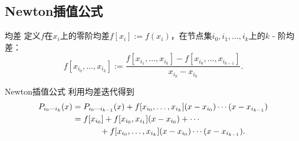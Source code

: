 \subsection{Newton插值公式}

\begin{definition}
    {均差}{}
    定义$f$在$x_i$上的零阶均差$f[x_i]:=f(x_i)$，在节点集$i_0,i_1,\ldots,i_k$上的$k$ - 阶均差：
    \begin{equation}
        f[x_{i_0},\ldots,x_{i_k}]:=\frac{f[x_{i_1},\ldots,x_{i_k}]-f[x_{i_0},\ldots,x_{i_{k-1}}]}{x_{i_k}-x_{i_0}}.
    \end{equation}
\end{definition}

\begin{theorem}
    {Newton插值公式}{}
    利用均差迭代得到    
    \begin{equation}
        \begin{aligned}
            P_{i_0\cdots i_k}(x)&=P_{i_0\cdots i_{k-1}}(x)+f[x_{i_0},\ldots,x_{i_k}](x-x_{i_0})\cdots(x-x_{i_{k-1}})\\
            &=f[x_{i_0}]+f[x_{i_0},x_{i_1}](x-x_{i_0})+\cdots\\
            &\qquad\quad~+f[x_{i_0},\ldots,x_{i_k}](x-x_{i_0})\cdots(x-x_{i_{k-1}}).
        \end{aligned}
    \end{equation}
\end{theorem}

